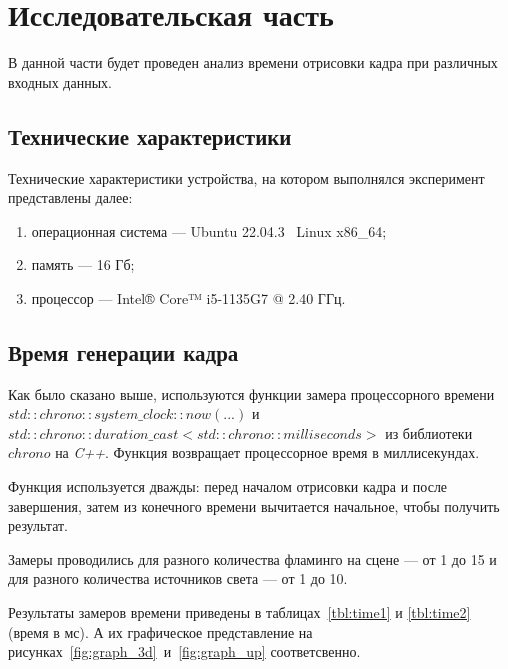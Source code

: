 \chapter{Исследовательская часть}

В данной части будет проведен анализ времени отрисовки кадра при различных входных данных.

\section{Технические характеристики}

Технические характеристики устройства, на котором выполнялся эксперимент представлены далее:

\begin{enumerate}[label=\arabic*)]
	\item операционная система --- Ubuntu 22.04.3~\cite{ubuntu} Linux x86\_64;
	\item память --- 16 Гб;
	\item процессор --- Intel® Core™ i5-1135G7 @ 2.40 ГГц.
\end{enumerate}

\section{Время генерации кадра}

Как было сказано выше, используются функции замера процессорного времени \textit{$std::chrono::system\_clock::now(...)$} и \textit{$std::chrono::duration\_cast<std::chrono::milliseconds>$} из библиотеки $chrono$ на \textit{C++}. Функция возвращает процессорное время в миллисекундах.

Функция используется дважды: перед началом отрисовки кадра и после завершения, затем из конечного времени вычитается начальное, чтобы получить результат.

Замеры проводились для разного количества фламинго на сцене --- от 1 до 15 и для разного количества источников света --- от 1 до 10.

Результаты замеров времени приведены в таблицах~\ref{tbl:time1} и \ref{tbl:time2} (время в мс). А их графическое представление на рисунках~\ref{fig:graph_3d}~и~\ref{fig:graph_up} соответсвенно.

